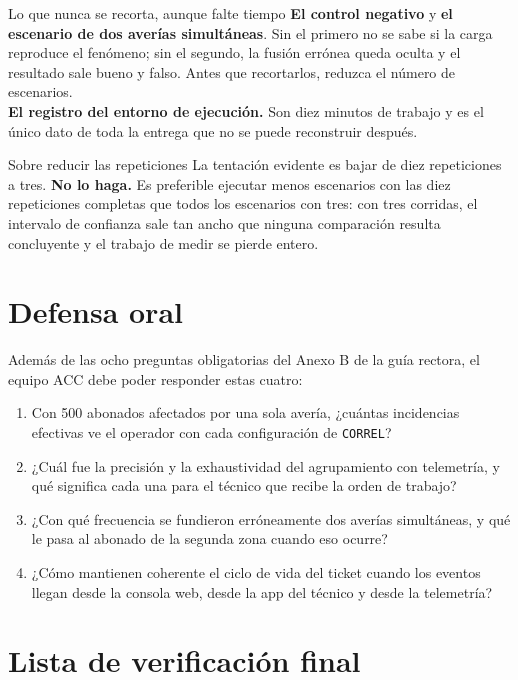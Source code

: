 \documentclass[11pt,a4paper]{article}
\begin{document}
\begin{pisoBox}{Lo que nunca se recorta, aunque falte tiempo}
	\textbf{El control negativo} y \textbf{el escenario de dos averías simultáneas}. Sin el primero no se sabe si la carga reproduce el fenómeno; sin el segundo, la fusión errónea queda oculta y el resultado sale bueno y falso. Antes que recortarlos, reduzca el número de escenarios.\\[5pt]
	\textbf{El registro del entorno de ejecución.} Son diez minutos de trabajo y es el único dato de toda la entrega que no se puede reconstruir después.
\end{pisoBox}

\begin{avisoBox}{Sobre reducir las repeticiones}
	La tentación evidente es bajar de diez repeticiones a tres. \textbf{No lo haga.} Es preferible ejecutar menos escenarios con las diez repeticiones completas que todos los escenarios con tres: con tres corridas, el intervalo de confianza sale tan ancho que ninguna comparación resulta concluyente y el trabajo de medir se pierde entero.
\end{avisoBox}

\section{Defensa oral}

Además de las ocho preguntas obligatorias del Anexo B de la guía rectora, el equipo ACC debe poder responder estas cuatro:

\begin{enumerate}[leftmargin=*,itemsep=3pt]
	\item Con 500 abonados afectados por una sola avería, ¿cuántas incidencias efectivas ve el operador con cada configuración de \texttt{CORREL}?
	\item ¿Cuál fue la precisión y la exhaustividad del agrupamiento con telemetría, y qué significa cada una para el técnico que recibe la orden de trabajo?
	\item ¿Con qué frecuencia se fundieron erróneamente dos averías simultáneas, y qué le pasa al abonado de la segunda zona cuando eso ocurre?
	\item ¿Cómo mantienen coherente el ciclo de vida del ticket cuando los eventos llegan desde la consola web, desde la app del técnico y desde la telemetría?
\end{enumerate}

\section{Lista de verificación final}
\end{document}
